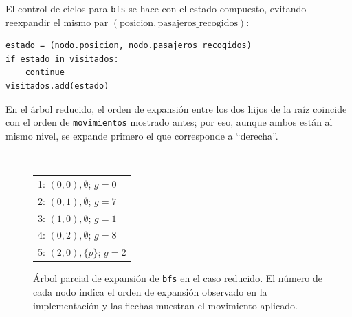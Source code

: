 \documentclass[12pt,a4paper]{article}
\newcommand{\treeopdraw}[5]{%
    \draw[movearrow] ($ (#1)!#3!(#2) + #4 $) -- ($ (#1)!#3!(#2) + #5 $);
}
\begin{document}
El control de ciclos para \texttt{bfs} se hace con el estado compuesto, evitando reexpandir el mismo par \((\text{posicion},\text{pasajeros\_recogidos})\):

\begin{lstlisting}[style=pythonstyle,caption={Control de ciclos en BFS}]
estado = (nodo.posicion, nodo.pasajeros_recogidos)
if estado in visitados:
    continue
visitados.add(estado)
\end{lstlisting}

En el árbol reducido, el orden de expansión entre los dos hijos de la raíz coincide con el orden de \texttt{movimientos} mostrado antes; por eso, aunque ambos están al mismo nivel, se expande primero el que corresponde a ``derecha''.

\begin{figure}[H]
    \centering
    \begin{minipage}{0.38\textwidth}
        \centering
        \\[0.05cm]
        {\scriptsize
        \begin{tabular}{@{}l@{}}
        1: $(0,0),\emptyset$; $g=0$ \\
        2: $(0,1),\emptyset$; $g=7$ \\
        3: $(1,0),\emptyset$; $g=1$ \\
        4: $(0,2),\emptyset$; $g=8$ \\
        5: $(2,0),\{p\}$; $g=2$
        \end{tabular}}
    \end{minipage}
    \caption{Árbol parcial de expansión de \texttt{bfs} en el caso reducido. El número de cada nodo indica el orden de expansión observado en la implementación y las flechas muestran el movimiento aplicado.}
    \label{fig:bfs-reducido}
\end{figure}
\end{document}
